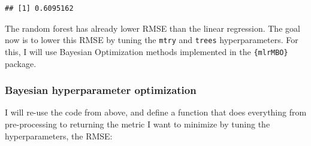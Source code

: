 \documentclass[]{gitbook}
\newenvironment{Shaded}{\begin{snugshade}}{\end{snugshade}}
\newcommand{\ControlFlowTok}[1]{\textcolor[rgb]{0.13,0.29,0.53}{\textbf{#1}}}
\newcommand{\DataTypeTok}[1]{\textcolor[rgb]{0.13,0.29,0.53}{#1}}
\newcommand{\DecValTok}[1]{\textcolor[rgb]{0.00,0.00,0.81}{#1}}
\newcommand{\KeywordTok}[1]{\textcolor[rgb]{0.13,0.29,0.53}{\textbf{#1}}}
\newcommand{\NormalTok}[1]{#1}
\newcommand{\OperatorTok}[1]{\textcolor[rgb]{0.81,0.36,0.00}{\textbf{#1}}}
\newcommand{\StringTok}[1]{\textcolor[rgb]{0.31,0.60,0.02}{#1}}
\theoremstyle{definition}
\theoremstyle{definition}
\theoremstyle{definition}
\theoremstyle{remark}
\begin{document}
\begin{verbatim}
## [1] 0.6095162
\end{verbatim}

The random forest has already lower RMSE than the linear regression. The
goal now is to lower this RMSE by tuning the \texttt{mtry} and
\texttt{trees} hyperparameters. For this, I will use Bayesian
Optimization methods implemented in the \texttt{\{mlrMBO\}} package.

\hypertarget{bayesian-hyperparameter-optimization}{%
\subsubsection{Bayesian hyperparameter
optimization}\label{bayesian-hyperparameter-optimization}}

I will re-use the code from above, and define a function that does
everything from pre-processing to returning the metric I want to
minimize by tuning the hyperparameters, the RMSE:

\begin{Shaded}
\end{Shaded}
\end{document}

